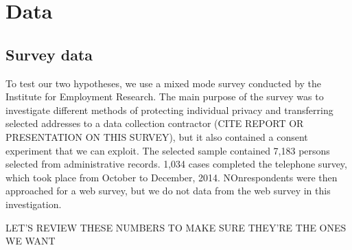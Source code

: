 


\section{Data}
\subsection {Survey data}

To test our two hypotheses, we use a mixed mode survey conducted by the Institute for Employment Research. The main purpose of the survey was to investigate different methods of protecting individual privacy and transferring selected addresses to a data collection contractor (CITE REPORT OR PRESENTATION ON THIS SURVEY), but it also contained a consent experiment that we can exploit. The selected sample contained 7,183 persons selected from administrative records. 1,034 cases completed the telephone survey, which took place from October to December, 2014. NOnrespondents were then approached for a web survey, but we do not data from the web survey in this investigation.

LET'S REVIEW THESE NUMBERS TO MAKE SURE THEY'RE THE ONES WE WANT

